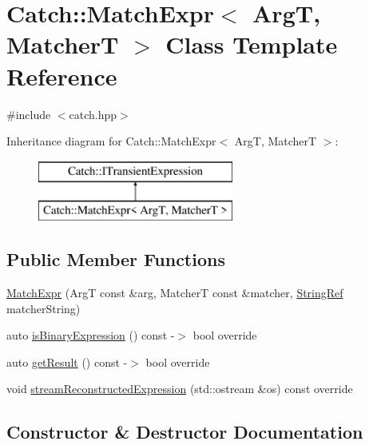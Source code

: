 \hypertarget{classCatch_1_1MatchExpr}{}\section{Catch\+:\+:Match\+Expr$<$ ArgT, MatcherT $>$ Class Template Reference}
\label{classCatch_1_1MatchExpr}


{\ttfamily \#include $<$catch.\+hpp$>$}

Inheritance diagram for Catch\+:\+:Match\+Expr$<$ ArgT, MatcherT $>$\+:\begin{figure}[H]
\begin{center}
\leavevmode
\includegraphics[height=2.000000cm]{classCatch_1_1MatchExpr}
\end{center}
\end{figure}
\subsection*{Public Member Functions}
\begin{DoxyCompactItemize}
\item 
\mbox{\hyperlink{classCatch_1_1MatchExpr_ab5b9ecc4fb9e91f5f48756e75affe93d}{Match\+Expr}} (ArgT const \&arg, MatcherT const \&matcher, \mbox{\hyperlink{classCatch_1_1StringRef}{String\+Ref}} matcher\+String)
\item 
auto \mbox{\hyperlink{classCatch_1_1MatchExpr_a932628935e0b257fcccec3d9cad58ffe}{is\+Binary\+Expression}} () const -\/$>$ bool override
\item 
auto \mbox{\hyperlink{classCatch_1_1MatchExpr_a61faf50ec55387909a9ff8520ebd0818}{get\+Result}} () const -\/$>$ bool override
\item 
void \mbox{\hyperlink{classCatch_1_1MatchExpr_ad3e41adb597750b2219bb37e51185629}{stream\+Reconstructed\+Expression}} (std\+::ostream \&os) const override
\end{DoxyCompactItemize}


\subsection{Constructor \& Destructor Documentation}
\mbox{\label{classCatch_1_1MatchExpr_ab5b9ecc4fb9e91f5f48756e75affe93d}} 
